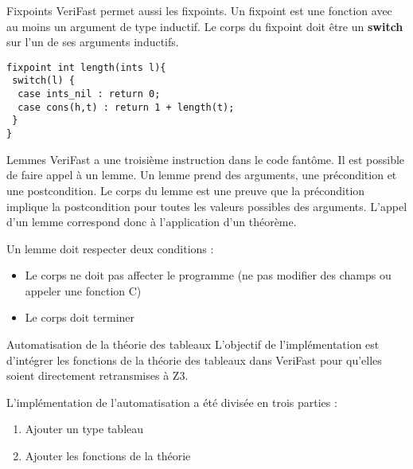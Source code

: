 \documentclass[9pt]{beamer}
\newcommand{\verifast}{VeriFast}
\begin{document}
\begin{frame}[fragile]{Fixpoints}
	\verifast{} permet aussi les fixpoints. Un fixpoint est une fonction avec au moins un argument de type inductif. Le corps du fixpoint doit \^etre un \textbf{switch} sur l'un de ses arguments inductifs. 
	\begin{lstlisting}
fixpoint int length(ints l){
 switch(l) {
  case ints_nil : return 0;
  case cons(h,t) : return 1 + length(t);
 }
}
	\end{lstlisting}
\end{frame}

\begin{frame}{Lemmes}
	\verifast{} a une troisi\`eme instruction dans le code fant\^ome. Il est possible de faire appel \`a un lemme. Un lemme prend des arguments, une pr\'econdition et une postcondition. Le corps du lemme est une preuve que la pr\'econdition implique la postcondition pour toutes les valeurs possibles des arguments. L'appel 	d'un lemme correspond donc \`a l'application d'un th\'eor\`eme.
	
	Un lemme doit respecter deux conditions :
	\begin{itemize}
	\item Le corps ne doit pas affecter le programme (ne pas modifier des champs ou appeler une fonction C)
	\item Le corps doit terminer
	\end{itemize}
\end{frame}

\begin{frame}{Automatisation de la th\'eorie des tableaux}
L'objectif de l'impl\'ementation est d'int\'egrer les fonctions de la th\'eorie des tableaux dans \verifast{} pour qu'elles soient directement retransmises \`a Z3.

L'impl\'ementation de l'automatisation a \'et\'e divis\'ee en trois parties :
	\begin{enumerate}
		\item Ajouter un type tableau 
		\item Ajouter les fonctions de la th\'eorie
	\end{enumerate}

\end{frame}
\end{document}
